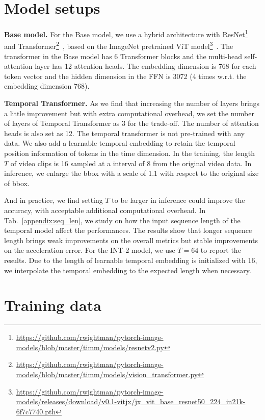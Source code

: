 
\section{Model setups}


\label{appendix:model}
{\bf Base model.} For the Base model, we use a hybrid architecture with ResNet\footnote{\url{https://github.com/rwightman/pytorch-image-models/blob/master/timm/models/resnetv2.py}}~\citep{resnet:he2016deep} and Transformer\footnote{\url{https://github.com/rwightman/pytorch-image-models/blob/master/timm/models/vision_transformer.py}}~\citep{transformer:vaswani2017attention}, based on the ImageNet pretrained ViT model\footnote{\url{https://github.com/rwightman/pytorch-image-models/releases/download/v0.1-vitjx/jx_vit_base_resnet50_224_in21k-6f7c7740.pth}}~\citep{vit:dosovitskiy2020image}. 
The transformer in the Base model has 6 Transformer blocks and the multi-head self-attention layer has 12 attention heads. 
The embedding dimension is 768 for each token vector and the hidden dimension in the FFN is 3072 (4 times w.r.t. the embedding dimension 768).  

{\bf Temporal Transformer.} As we find that increasing the number of layers brings a little improvement but with extra computational overhead,  we set the number of layers of Temporal Transformer as 3 for the trade-off. The number of attention heads is also set as 12. The temporal transformer is not pre-trained with any data.
We also add a learnable temporal embedding to retain the temporal position information of tokens in the time dimension. 
In the training, the length $T$ of video clips is 16 sampled at a interval of 8 from the original video data. In inference, we enlarge the bbox with a scale of 1.1 with respect to the original size of bbox. 

And in practice, we find setting $T$ to be larger in inference could improve the accuracy, with acceptable additional computational overhead. In Tab.~\ref{appendix:seq_len}, we study on how the input sequence length of the temporal model affect the performances. The results show that longer sequence length brings weak improvements on the overall metrics but stable improvements on the acceleration error. For the INT-2 model, we use $T=64$ to report the results. Due to the length of learnable temporal embedding is initialized with 16, we interpolate the temporal embedding to the expected length when necessary.

\section{Training data}
\label{appendix:data}

